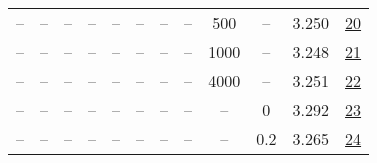\begin{table}[H]
\begin{tabular}{cccccccccccc}
-- & -- & -- & -- & -- & -- & -- & -- & 500 & -- & 3.250 & \href{https://wandb.ai/stanford-mercury/optimizer-scaling/runs/sweep-130m-21B-mars602214lr0.008-wd0.1-minlr0-warmup500-b10.98-b-4209ae}{20} \\
-- & -- & -- & -- & -- & -- & -- & -- & 1000 & -- & 3.248 & \href{https://wandb.ai/stanford-mercury/optimizer-scaling/runs/sweep-130m-21B-mars998481lr0.008-wd0.1-minlr0-warmup1000-b10.98--5adede}{21} \\
-- & -- & -- & -- & -- & -- & -- & -- & 4000 & -- & 3.251 & \href{https://wandb.ai/stanford-mercury/optimizer-scaling/runs/sweep-130m-21B-mars5529aclr0.008-wd0.1-minlr0-warmup4000-b10.98--e1dc78}{22} \\
-- & -- & -- & -- & -- & -- & -- & -- & -- & 0 & 3.292 & \href{https://wandb.ai/stanford-mercury/optimizer-scaling/runs/sweep-130m-21B-mars3f0fadlr0.008-wd0-minlr0-warmup2000-b10.98-b2-ac9f0b}{23} \\
-- & -- & -- & -- & -- & -- & -- & -- & -- & 0.2 & 3.265 & \href{https://wandb.ai/stanford-mercury/optimizer-scaling/runs/sweep-130m-21B-mars09ac0flr0.008-wd0.2-minlr0-warmup2000-b10.98--0edd7e}{24} \\
\bottomrule
\end{tabular}
\end{table}

